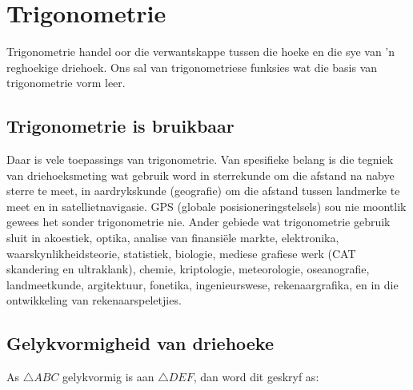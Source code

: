 \chapter{Trigonometrie}
\setcounter{figure}{1}
\setcounter{subfigure}{1}

Trigonometrie handel oor die verwantskappe tussen die hoeke en die sye van 'n reghoekige driehoek. Ons sal van trigonometriese funksies wat die basis van trigonometrie vorm leer.\par 

\section{Trigonometrie is bruikbaar}
\nopagebreak
Daar is vele toepassings van trigonometrie. Van spesifieke belang is die tegniek van driehoeksmeting wat gebruik word in sterrekunde om die afstand na nabye sterre te meet, in aardrykskunde (geografie) om die afstand tussen landmerke te meet en in satellietnavigasie. GPS (globale posisioneringstelsels) sou nie moontlik gewees het sonder trigonometrie nie. Ander gebiede wat trigonometrie gebruik sluit in akoestiek, optika, analise van finansi\"ele markte, elektronika, waarskynlikheidsteorie, statistiek, biologie, mediese grafiese werk (CAT skandering en ultraklank), chemie, kriptologie, meteorologie, oseanografie, landmeetkunde, argitektuur, fonetika, ingenieurswese, rekenaargrafika, en in die ontwikkeling van rekenaarspeletjies.\par 

%             

\section{Gelykvormigheid van driehoeke}

As $\triangle ABC$ gelykvormig is aan $ \triangle DEF$, dan word dit geskryf as:\par 

